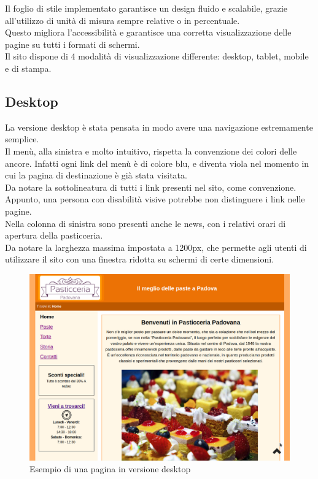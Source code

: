Il foglio di stile implementato garantisce un design fluido e scalabile, grazie all'utilizzo di unità di misura
sempre relative o in percentuale. \\Questo migliora l'accessibilità e garantisce una corretta visualizzazione delle pagine
su tutti i formati di schermi. \\Il sito dispone di 4 modalità di visualizzazione differente: desktop, tablet, mobile e di stampa.

\subsection{Desktop}
La versione desktop è stata pensata in modo avere una navigazione estremamente semplice.\\ 
Il menù, alla sinistra e molto intuitivo, rispetta la convenzione dei colori delle ancore. Infatti ogni link del menù è di colore blu, e diventa
viola nel momento in cui la pagina di destinazione è già stata visitata. \\Da notare la sottolineatura di tutti i link presenti nel sito, come convenzione.
Appunto, una persona con disabilità visive potrebbe non distinguere i link nelle pagine.\\
Nella colonna di sinistra sono presenti anche le news, con i relativi orari di apertura della pasticceria.\\ 
Da notare la larghezza massima impostata a 1200px, che permette agli utenti di utilizzare il sito con una finestra ridotta su schermi di certe dimensioni.

\begin{figure}[!h]
	\centering
	\includegraphics[width=1\linewidth]{sezioni/Progettazione/Immagini/desktop_example.png}
	\caption{Esempio di una pagina in versione desktop}
	\label{Fig:verDesktop}
\end{figure}

